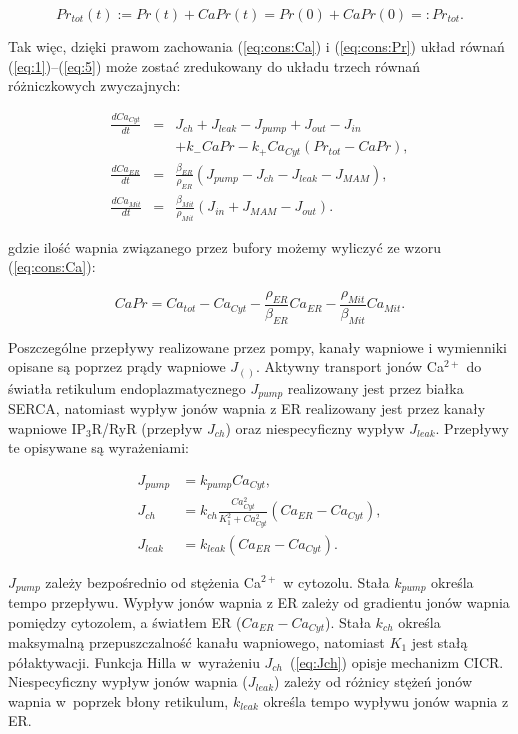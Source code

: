 \begin{equation} \label{eq:cons:Pr}
Pr_{tot}(t) := Pr(t) + CaPr(t) = Pr(0) + CaPr(0)=:Pr_{tot}.
\end{equation}

\noindent Tak więc, dzięki prawom zachowania (\ref{eq:cons:Ca}) i (\ref{eq:cons:Pr}) układ równań (\ref{eq:1})--(\ref{eq:5}) może zostać zredukowany do układu trzech równań różniczkowych zwyczajnych:

\begin{eqnarray}\nonumber
\frac{dCa_{Cyt}}{dt}&=&J_{ch}+J_{leak}-J_{pump}+J_{out}-J_{in}\\
			&& +k_-CaPr-k_+Ca_{Cyt}(Pr_{tot} - CaPr), \label{eq:1a}\\
\frac{dCa_{ER}}{dt}&=&\frac{\beta_{ER}}{\rho_{ER}}\left(J_{pump}-J_{ch}
			-J_{leak} -J_{MAM}\right), \label{eq:2a}\\
\frac{dCa_{Mit}}{dt}&=&\frac{\beta_{Mit}}{\rho_{Mit}}\left(J_{in}+J_{MAM}
			-J_{out}\right). \label{eq:3a}
\end{eqnarray}

\noindent gdzie ilość wapnia związanego przez bufory możemy wyliczyć ze wzoru (\ref{eq:cons:Ca}):

\begin{equation} \label{eq:CaPr}
CaPr = Ca_{tot} - Ca_{Cyt} - \frac{\rho_{ER}}{\beta_{ER}}Ca_{ER} 
				- \frac{\rho_{Mit}}{\beta_{Mit}}Ca_{Mit}.
\end{equation}

Poszczególne przepływy realizowane przez pompy, kanały wapniowe i wymienniki opisane są poprzez prądy wapniowe $J_{()}$. Aktywny transport jonów Ca$^{2+}$ do światła retikulum endoplazmatycznego $J_{pump}$ realizowany jest przez białka SERCA, natomiast wypływ jonów wapnia z ER realizowany jest przez kanały wapniowe IP$_3$R/RyR (przepływ $J_{ch}$) oraz niespecyficzny wypływ $J_{leak}$. Przepływy te opisywane są wyrażeniami:

\begin{align}
J_{pump}&= k_{pump}Ca_{Cyt},\\
J_{ch}&= k_{ch}\frac{Ca_{Cyt}^2}{K_1^2+Ca_{Cyt}^2}
											\left(Ca_{ER}-Ca_{Cyt}\right),\label{eq:Jch}\\
J_{leak}&= k_{leak}\left(Ca_{ER}-Ca_{Cyt}\right).
\end{align}

$J_{pump}$ zależy bezpośrednio od stężenia Ca$^{2+}$ w cytozolu. Stała $k_{pump}$ określa tempo przepływu. Wypływ jonów wapnia z ER zależy od gradientu jonów wapnia pomiędzy cytozolem, a światłem ER ($Ca_{ER}-Ca_{Cyt}$). Stała $k_{ch}$ określa maksymalną przepuszczalność kanału wapniowego, natomiast $K_1$ jest stałą półaktywacji. Funkcja Hilla w~wyrażeniu $J_{ch}$~(\ref{eq:Jch}) opisje mechanizm CICR. Niespecyficzny wypływ jonów wapnia ($J_{leak}$) zależy od różnicy stężeń jonów wapnia w~poprzek błony retikulum, $k_{leak}$ określa tempo wypływu jonów wapnia z ER.

